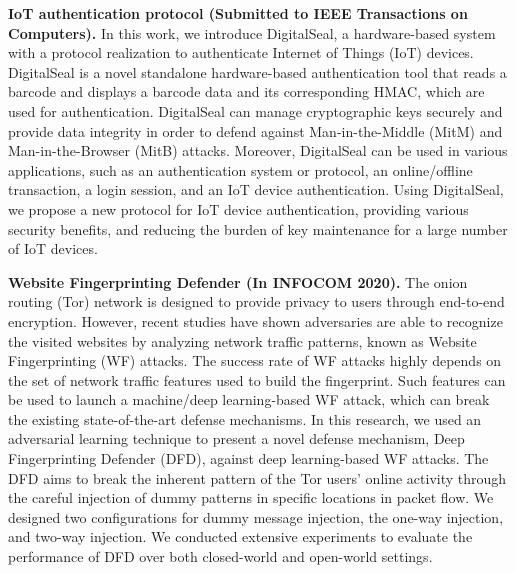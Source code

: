\documentclass{NSF}
\newcommand{\BfPara}[1]{{\noindent\textbf{#1.}}\xspace}
\begin{document}
\BfPara{IoT authentication protocol (Submitted to IEEE Transactions on Computers)} In this work, we introduce DigitalSeal, a hardware-based system with a protocol realization to authenticate Internet of Things (IoT) devices. DigitalSeal is a novel standalone hardware-based authentication tool that reads a barcode and displays a barcode data and its corresponding HMAC, which are used for authentication. DigitalSeal can manage cryptographic keys securely and provide data integrity in order to defend against Man-in-the-Middle (MitM) and Man-in-the-Browser (MitB) attacks. Moreover, DigitalSeal can be used in various applications, such as an authentication system or protocol, an online/offline transaction, a login session, and an IoT device authentication. Using DigitalSeal, we propose a new protocol for IoT device authentication, providing various security benefits, and reducing the burden of key maintenance for a large number of IoT devices. 

\BfPara{Website Fingerprinting Defender (In INFOCOM 2020)} The onion routing (Tor) network is designed to provide privacy to users through end-to-end encryption. However, recent studies have shown adversaries are able to recognize the visited websites by analyzing network traffic patterns, known as Website Fingerprinting (WF) attacks. The success rate of WF attacks highly depends on the set of network traffic features used to build the fingerprint. Such features can be used to launch a machine/deep learning-based WF attack, which can break the existing state-of-the-art defense mechanisms. In this research, we used an adversarial learning technique to present a novel defense mechanism, Deep Fingerprinting Defender (DFD), against deep learning-based WF attacks. The DFD aims to break the inherent pattern of the Tor users' online activity through the careful injection of dummy patterns in specific locations in packet flow. We designed two configurations for dummy message injection, the one-way injection, and two-way injection. We conducted extensive experiments to evaluate the performance of DFD over both closed-world and open-world settings. %


\end{document}
